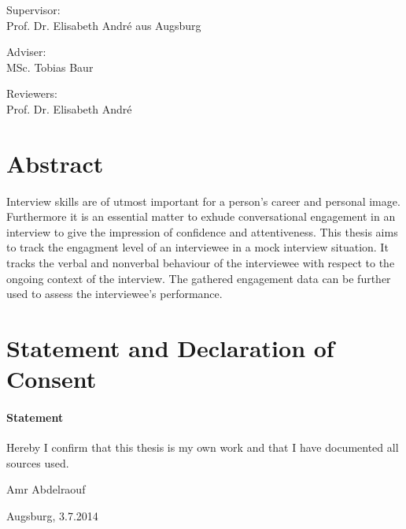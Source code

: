\documentclass[12pt, a4paper, fleqn]{memoir}%
\begin{document}
\vspace{2.0em}
\begin{center}
    \normalsize
    Supervisor:\\ 
    Prof. Dr. Elisabeth Andr\'{e} aus Augsburg
\end{center}
\begin{center}
    \normalsize
    Adviser:\\
    MSc. Tobias Baur
\end{center}
\begin{center}
    \normalsize
    Reviewers:\\
    Prof. Dr. Elisabeth Andr\'{e}\\
\end{center}
\cleardoublepage

\chapter*{Abstract}
Interview skills are of utmost important for a person's career and personal image. Furthermore it is an essential matter to exhude conversational engagement in an interview to give the impression of confidence and attentiveness. This thesis aims to track the engagment level of an interviewee in a mock interview situation. It tracks the verbal and nonverbal behaviour of the interviewee with respect to the ongoing context of the interview. The gathered engagement data can be further used to assess the interviewee's performance.

\chapter*{Statement and Declaration of Consent}
\vfill
\subsubsection*{\LARGE Statement}
Hereby I confirm that this thesis is my own work and that I have documented all sources used.
\vfill
\begin{flushleft}
Amr Abdelraouf
\end{flushleft}  
\begin{flushright}
Augsburg, 3.7.2014 
\end{flushright}
\vfill
\vfill
\end{document}
